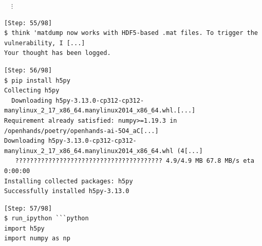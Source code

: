\begin{tcolorbox}[enhanced,title={Example of compiling the project and constructing PoCs with Python}]
\vspace{-\baselineskip}
$\quad\vdots$
\vspace{-.5\baselineskip}
\begin{verbatim}
[Step: 55/98]
$ think 'matdump now works with HDF5-based .mat files. To trigger the vulnerability, I [...]
Your thought has been logged.
\end{verbatim}
\begin{verbatim}
[Step: 56/98]
$ pip install h5py
Collecting h5py
  Downloading h5py-3.13.0-cp312-cp312-manylinux_2_17_x86_64.manylinux2014_x86_64.whl.[...]
Requirement already satisfied: numpy>=1.19.3 in /openhands/poetry/openhands-ai-5O4_aC[...]
Downloading h5py-3.13.0-cp312-cp312-manylinux_2_17_x86_64.manylinux2014_x86_64.whl (4[...]
   ???????????????????????????????????????? 4.9/4.9 MB 67.8 MB/s eta 0:00:00
Installing collected packages: h5py
Successfully installed h5py-3.13.0
\end{verbatim}
\begin{verbatim}
[Step: 57/98]
$ run_ipython ```python
import h5py
import numpy as np


\end{verbatim}
\end{tcolorbox}
